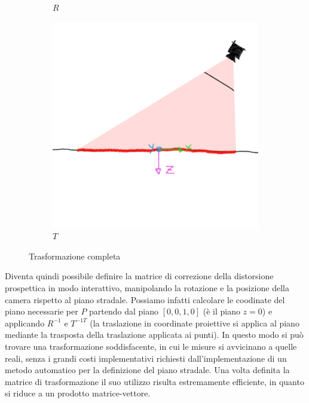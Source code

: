 \begin{figure}[h]
\begin{subfigure}{.32\textwidth}
        \caption{$R$}
    \end{subfigure}
    \hfill
    \begin{subfigure}{.32\textwidth}
        \includegraphics[width=\textwidth]{images/T.png}
        \caption{$T$}
    \end{subfigure}
    \caption{Trasformazione completa}
    \label{fig:tcombo}
\end{figure}

Diventa quindi possibile definire la matrice di correzione della distorsione prospettica in modo interattivo, manipolando la rotazione e la posizione della camera rispetto al piano stradale.
Possiamo infatti calcolare le coodinate del piano necessarie per $P$ partendo dal piano $[0, 0, 1, 0]$ (è il piano $z=0$) e applicando $R^{-1}$ e $T^{-1T}$ (la traslazione in coordinate proiettive si applica al piano mediante la trasposta della traslazione applicata ai punti).
In questo modo si può trovare una trasformazione soddisfacente, in cui le misure si avvicinano a quelle reali, senza i grandi costi implementativi richiesti dall'implementazione di un metodo automatico per la definizione del piano stradale.
Una volta definita la matrice di trasformazione il suo utilizzo risulta estremamente efficiente, in quanto si riduce a un prodotto matrice-vettore.

